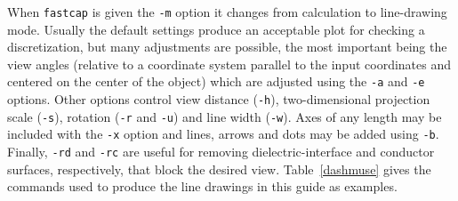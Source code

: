When {\tt fastcap} is given the {\tt -m} option it changes from
calculation to line-drawing mode.  Usually the default settings
produce an acceptable plot for checking
a discretization, but many adjustments are possible,
the most important being the  view angles (relative to a coordinate
system parallel to the input coordinates and centered on the 
center of the object) which are adjusted using the
{\tt -a} and {\tt -e} options.  Other options control view distance
({\tt -h}), two-dimensional projection scale ({\tt -s}), rotation
({\tt -r} and {\tt -u}) and line width ({\tt -w}). Axes of any length
may be included  with the {\tt -x} option and lines, arrows and dots may be
added using {\tt -b}. Finally, {\tt -rd} and {\tt -rc} are useful
for removing dielectric-interface and conductor surfaces, respectively,
that block the desired view.
Table~\ref{dashmuse} gives the commands used to produce the line
drawings in this guide as examples. 
